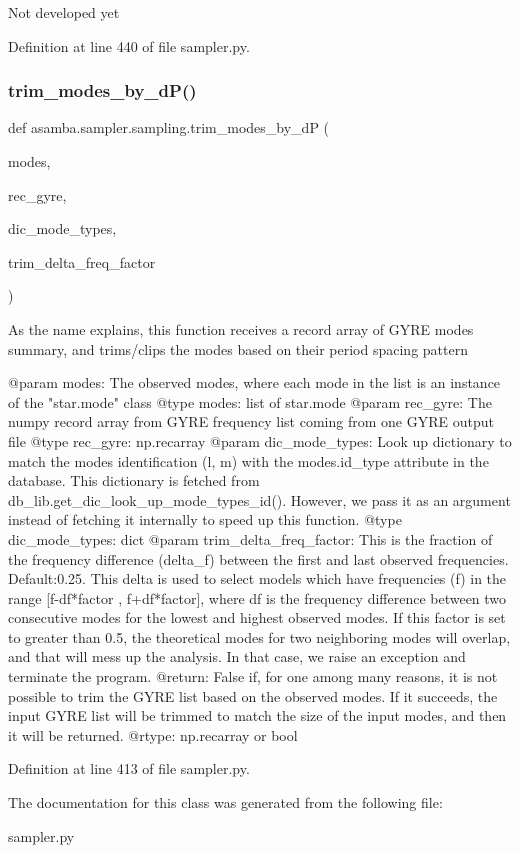 \begin{DoxyVerb}Not developed yet \end{DoxyVerb}
 

Definition at line 440 of file sampler.\+py.

\mbox{\label{classasamba_1_1sampler_1_1sampling_a8058c0e4f2aa8642f7b19daeb016d73a}} 
\subsubsection{\texorpdfstring{trim\+\_\+modes\+\_\+by\+\_\+d\+P()}{trim\_modes\_by\_dP()}}
{\footnotesize\ttfamily def asamba.\+sampler.\+sampling.\+trim\+\_\+modes\+\_\+by\+\_\+dP (\begin{DoxyParamCaption}\item[{}]{modes,  }\item[{}]{rec\+\_\+gyre,  }\item[{}]{dic\+\_\+mode\+\_\+types,  }\item[{}]{trim\+\_\+delta\+\_\+freq\+\_\+factor }\end{DoxyParamCaption})}

\begin{DoxyVerb}As the name explains, this function receives a record array of GYRE modes summary, and trims/clips
the modes based on their period spacing pattern

@param modes: The observed modes, where each mode in the list is an instance of the "star.mode" class
@type modes: list of star.mode
@param rec_gyre: The numpy record array from GYRE frequency list coming from one GYRE output file
@type rec_gyre: np.recarray
@param dic_mode_types: Look up dictionary to match the modes identification (l, m) with the modes.id_type
  attribute in the database. This dictionary is fetched from db_lib.get_dic_look_up_mode_types_id(). 
  However, we pass it as an argument instead of fetching it internally to speed up this function.
@type dic_mode_types: dict
@param trim_delta_freq_factor: This is the fraction of the frequency difference (delta_f) between the 
  first and last observed frequencies. Default:0.25. This delta is used to select models which have
  frequencies (f) in the range [f-df*factor , f+df*factor], where df is the frequency difference between
  two consecutive modes for the lowest and highest observed modes. If this factor is set to greater than
  0.5, the theoretical modes for two neighboring modes will overlap, and that will mess up the analysis.
  In that case, we raise an exception and terminate the program.
@return: False if, for one among many reasons, it is not possible to trim the GYRE list based on the 
  observed modes. If it succeeds, the input GYRE list will be trimmed to match the size of the input
  modes, and then it will be returned.
@rtype: np.recarray or bool
\end{DoxyVerb}
 

Definition at line 413 of file sampler.\+py.



The documentation for this class was generated from the following file\+:\begin{DoxyCompactItemize}
\item 
sampler.\+py\end{DoxyCompactItemize}
